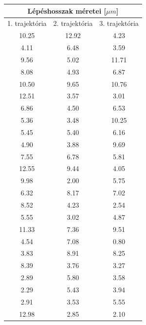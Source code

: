 \label{tab:3}
\begin{multicols}{2}
\begin{tabular}{||c|c|c||}
    \toprule
    \multicolumn{3}{||c||}{Lépéshosszak méretei [$\mu m$]} \\
    \hline
    1. trajektória  & 2. trajektória  & 3. trajektória  \\ \hline \hline
    10.25           & 12.92           & 4.23            \\ \hline
    4.11            & 6.48            & 3.59            \\ \hline
    9.56            & 5.02            & 11.71           \\ \hline
    8.08            & 4.93            & 6.87            \\ \hline
    10.50           & 9.65            & 10.76           \\ \hline
    12.51           & 3.57            & 3.01            \\ \hline
    6.86            & 4.50            & 6.53            \\ \hline
    5.36            & 3.48            & 10.25           \\ \hline
    5.45            & 5.40            & 6.16            \\ \hline
    4.90            & 3.88            & 9.69            \\ \hline
    7.55            & 6.78            & 5.81            \\ \hline
    12.55           & 9.44            & 4.05            \\ \hline
    9.98            & 2.00            & 5.75            \\ \hline
    6.32            & 8.17            & 7.02            \\ \hline
    8.52            & 4.23            & 2.54            \\ \hline
    5.55            & 3.02            & 4.87            \\ \hline
    11.33           & 7.36            & 9.51            \\ \hline
    4.54            & 7.08            & 0.80            \\ \hline
    3.83            & 8.91            & 8.25            \\ \hline
    8.39            & 3.76            & 3.27            \\ \hline
    2.89            & 5.80            & 3.58            \\ \hline
    2.29            & 5.43            & 3.94            \\ \hline
    2.91            & 3.53            & 5.55            \\ \hline
    12.98           & 2.85            & 2.10            \\
    \bottomrule
\end{tabular}


\end{multicols}
